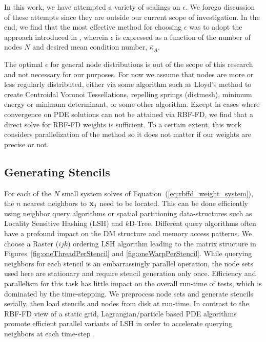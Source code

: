 \documentclass[11pt]{report}
\begin{document}
{In this work, we have attempted a variety of scalings on $\epsilon$. We forego discussion of these attempts since they are outside our current scope of investigation. In the end, we find that the most effective method for choosing $\epsilon$ was to adopt the approach introduced in \cite{FlyerLehto11}, wherein $\epsilon$ is expressed as a function of the number of nodes $N$ and desired mean condition number, $\bar{\kappa}_A$. 


The optimal $\epsilon$ for general node distributions is out of the scope of this research and not necessary for our purposes. For now we assume that nodes are more or less regularly distributed, either via some algorithm such as Lloyd's method to create Centroidal Voronoi Tessellations, repelling springs (distmesh), minimum energy or minimum determinant, or some other algorithm. Except in cases where convergence on PDE solutions can not be attained via RBF-FD, we find that a direct solve for RBF-FD weights is sufficient. To a certain extent, this work considers parallelization of the method so it does not matter if our weights are precise or not. 

\subsection{Generating Stencils}

For each of the $N$ small system solves of Equation~(\ref{eq:rbffd_weight_system}), the $n$ nearest neighbors to $\mathbf{x}_j$ need to be located. This can be done efficiently using neighbor query algorithms or spatial partitioning data-structures such as Locality Sensitive Hashing (LSH) and $k$D-Tree. Different query algorithms often have a profound impact on the DM structure and memory access patterns. We choose a Raster ($ijk$) ordering LSH algorithm \cite{Bollig2011} leading to the matrix structure in Figures~\ref{fig:oneThreadPerStencil} and \ref{fig:oneWarpPerStencil}. While querying neighbors for each stencil is an embarrassingly parallel operation, the node sets used here are stationary and require stencil generation only once. Efficiency and parallelism for this task has little impact on the overall run-time of tests, which is dominated by the time-stepping. We preprocess node sets and generate stencils serially, then load stencils and nodes from disk at run-time. In contrast to the RBF-FD view of a static grid, Lagrangian/particle based PDE algorithms promote efficient parallel variants of LSH in order to accelerate querying neighbors at each time-step \cite{Pan2011, Goswami2010}. 


}
\end{document}
